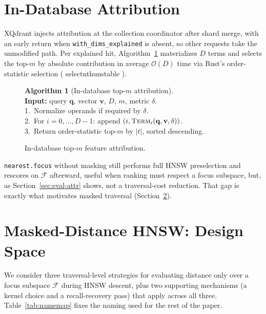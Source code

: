 \documentclass[sigconf,review,balance=false]{acmart}
\newcommand{\breakablecode}[1]{%
  {\ttfamily
    \renewcommand{\_}{\textunderscore\allowbreak}%
    #1%
  }}
\begin{document}
\section{In-Database Attribution}
\label{sec:attribution}

XQdrant injects attribution at the collection coordinator after shard merge,
with an early return when \texttt{with\_dims\_explained} is absent, so other
requests take the unmodified path. Per explained hit, Algorithm~\ref{alg:attribution}
materializes $D$ terms and selects the top-$m$ by absolute contribution in
average $\mathcal{O}(D)$ time via Rust's order-statistic selection
(\breakablecode{select\_nth\_unstable}).

\begin{figure}[htbp]
\centering
\begin{minipage}{0.92\linewidth}
\small
\textbf{Algorithm 1} (In-database top-$m$ attribution).\\
\textbf{Input:} query $\mathbf{q}$, vector $\mathbf{v}$, $D$, $m$, metric $\delta$.\\
1.\ Normalize operands if required by $\delta$.\\
2.\ For $i=0,\ldots,D-1$: append $(i,\textsc{Term}_i(\mathbf{q},\mathbf{v},\delta))$.\\
3.\ Return order-statistic top-$m$ by $|t|$, sorted descending.
\end{minipage}
\caption{In-database top-$m$ feature attribution.}
\label{alg:attribution}
\end{figure}

\texttt{nearest.focus} without masking still performs full HNSW preselection
and rescores on $\mathcal{F}$ afterward, useful when ranking must respect a
focus subspace, but, as Section~\ref{sec:eval-attr} shows, not a
traversal-cost reduction. That gap is exactly what motivates masked
traversal (Section~\ref{sec:masked}).

\section{Masked-Distance HNSW: Design Space}
\label{sec:masked}

We consider three traversal-level strategies for evaluating distance only over
a focus subspace $\mathcal{F}$ during HNSW descent, plus two supporting
mechanisms (a kernel choice and a recall-recovery pass) that apply across all
three. Table~\ref{tab:namemap} fixes the naming used for the rest of the paper.
\end{document}
